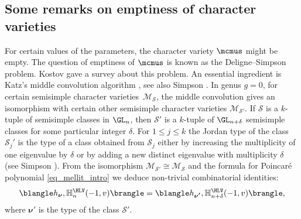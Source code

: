 \subsection{Some remarks on emptiness of character varieties}\label{subsect_emptiness}
For certain values of the parameters, the character variety $\mcmus$ might be empty. The question of emptiness of $\mcmus$ is known as the Deligne--Simpson problem. Kostov \cite{Kostov04} gave a survey about this problem. An essential ingredient is Katz's middle convolution algorithm \cite{Katz96}, see also Simpson \cite{Simpson_middle_convolution}. In genus $g=0$, for certain semisimple character varieties~$\mathcal{M}_{\boldsymbol{\mathcal{S}}}$, the middle convolution gives an isomorphism with certain other semisimple character varieties $\mathcal{M}_{\boldsymbol{\mathcal{S}'}}$. If $\boldsymbol{\mathcal{S}}$ is a $k$-tuple of semisimple classes in $\GL_n$, then $\boldsymbol{\mathcal{S}'}$ is a $k$-tuple of $\GL_{n+\delta}$ semisimple classes for some particular integer $\delta$. For $1\le j \le k$ the Jordan type of the class $\mathcal{S}_j'$ is the type of a class obtained from $\mathcal{S}_j$ either by increasing the multiplicity of one eigenvalue by $\delta$ or by adding a new distinct eigenvalue with multiplicity $\delta$ (see Simpson \cite[\S 4]{Simpson_middle_convolution}). From the isomorphism $\mathcal{M}_{\boldsymbol{\mathcal{S}'}}\cong \mathcal{M}_{\boldsymbol{\mathcal{S}}}$ and the formula for Poincaré polynomial \eqref{eq_mellit_intro} we deduce non-trivial combinatorial identities:\enlargethispage{\baselineskip}%
\[
\blangle h_{\boldsymbol{\nu}},\mathbb{H}_n^{\HLV}(-1,v)\brangle =\blangle h_{\boldsymbol{\nu'}},\mathbb{H}_{n+\delta}^{\HLV}(-1,v)\brangle,
\]
where $\boldsymbol{\nu}'$ is the type of the class $\boldsymbol{\mathcal{S}'}$.

